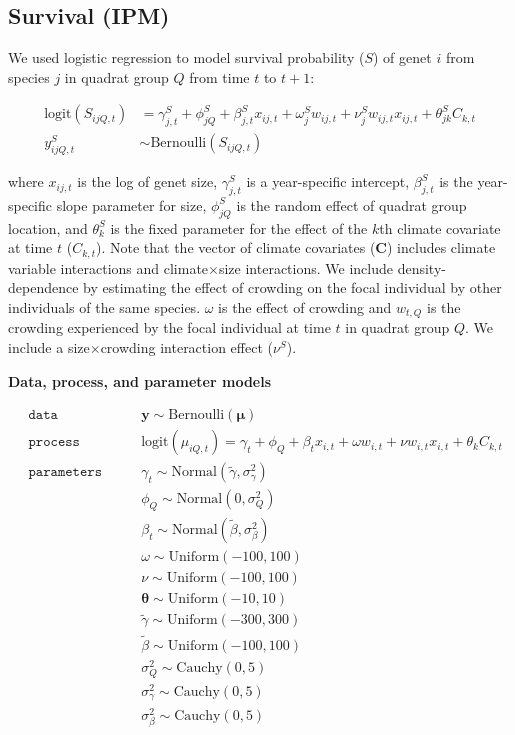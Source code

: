\documentclass[12pt,]{article}
\begin{document}
\subsection{Survival (IPM)}\label{survival-ipm}

We used logistic regression to model survival probability ($S$) of genet
$i$ from species $j$ in quadrat group $Q$ from time $t$ to $t+1$:

\begin{align}
\text{logit}(S_{ijQ,t}) &= \gamma^{S}_{j,t} + \phi^{S}_{jQ} + \beta^{S}_{j,t}x_{ij,t} + \omega^{S}_{j}w_{ij,t} + \nu^{S}_{j}w_{ij,t}x_{ij,t} + \theta^{S}_{jk}C_{k,t} \\
y^{S}_{ijQ,t} &\sim \text{Bernoulli}(S_{ijQ,t})
\end{align}

where $x_{ij,t}$ is the log of genet size, $\gamma^{S}_{j,t}$ is a
year-specific intercept, $\beta^{S}_{j,t}$ is the year-specific slope
parameter for size, $\phi^{S}_{jQ}$ is the random effect of quadrat
group location, and $\theta^{S}_{k}$ is the fixed parameter for the
effect of the $k$th climate covariate at time $t$ ($C_{k,t}$). Note that
the vector of climate covariates (\textbf{C}) includes climate variable
interactions and climate$\times$size interactions. We include
density-dependence by estimating the effect of crowding on the focal
individual by other individuals of the same species. $\omega$ is the
effect of crowding and $w_{t,Q}$ is the crowding experienced by the
focal individual at time $t$ in quadrat group $Q$. We include a
size$\times$crowding interaction effect ($\nu^{S}$).

\textbf{Data, process, and parameter models}

\begin{align}
&\mathtt{data} \qquad &\textbf{y} \sim \text{Bernoulli}(\boldsymbol{\mu}) \\
&\mathtt{process} \qquad &\text{logit}(\mu_{iQ,t}) = \gamma_{t} + \phi_{Q} + \beta_{t}x_{i,t} + \omega w_{i,t} + \nu w_{i,t}x_{i,t} + \theta_{k}C_{k,t} \\
&\mathtt{parameters} \qquad &\gamma_{t} \sim \text{Normal}(\tilde{\gamma}, \sigma_\gamma^2)\\
& \qquad & \phi_{Q} \sim \text{Normal}(0,\sigma_Q^2) \\
& \qquad & \beta_{t} \sim \text{Normal}(\tilde{\beta}, \sigma_\beta^2) \\
& \qquad & \omega \sim \text{Uniform}(-100, 100) \\
& \qquad & \nu \sim \text{Uniform}(-100, 100) \\
& \qquad & \boldsymbol{\theta} \sim \text{Uniform}(-10, 10) \\
& \qquad & \tilde{\gamma} \sim \text{Uniform}(-300, 300) \\
& \qquad & \tilde{\beta} \sim \text{Uniform}(-100, 100) \\
& \qquad & \sigma_Q^2 \sim \text{Cauchy}(0, 5) \\
& \qquad & \sigma_\gamma^2 \sim \text{Cauchy}(0, 5) \\
& \qquad & \sigma_\beta^2 \sim \text{Cauchy}(0, 5)
\end{align}
\end{document}

